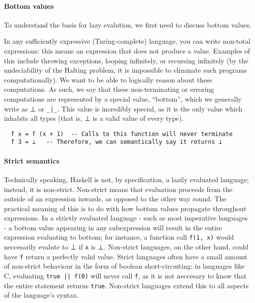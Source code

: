 \documentclass[9pt]{extarticle}
\begin{document}
\paragraph{Bottom values}

To understand the basis for lazy evalution, we first need to discuss bottom values.

In any sufficiently expressive (Turing-complete) language, you can write
non-total expressions: this means an expression that does not produce a
value. Examples of this include throwing exceptions, looping infinitely,
or recursing infinitely (by the undeciability of the Halting problem, it
is impossible to eliminate such programs computationally). We want to be
able to logically reason about these computations. As such, we say that
these non-terminating or erroring computations are represented by a
special value, ``bottom'', which we generally write as ⊥ or
\verb'_|_'. This value is incredibly special, as it is the only value
which inhabits all types (that is, ⊥ is a valid value of every
type).

\begin{verbatim}
  f x = f (x + 1)  -- Calls to this function will never terminate
  f 3 = ⊥   -- Therefore, we can semantically say it returns ⊥
\end{verbatim}

\paragraph{Strict semantics}

Technically speaking, Haskell is not, by specification, a lazily
evaluated language; instead, it is non-strict. Non-strict means that
evaluation proceeds from the outside of an expression inwards, as
opposed to the other way round. The practical meaning of this is to do
with how bottom values propagate throughout expressions. In a strictly
evaluated language - such as most imperative languages - a bottom value
appearing in any subexpression will result in the entire expression
evaluating to bottom; for instance, a function call \verb'f(1, x)' would
neccesarily evalute to ⊥ if \verb'x' is ⊥. Non-strict
languages, on the other hand, could have \verb'f' return a perfectly
valid value. Strict languages often have a small amount of non-strict
behaviour in the form of boolean short-circuiting: in languages like C,
evaluating \verb'true || f(0)' will never call \verb'f', as it is not
neccesary to know that the entire statement returns \verb'true'.
Non-strict languages extend this to all aspects of the language's
syntax.
\end{document}
